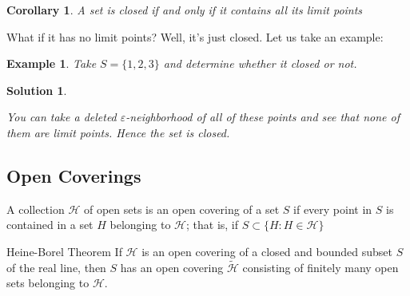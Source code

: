 \documentclass{article}
\newcommand{\sub}{\subset}
\newcommand{\e}{\varepsilon}
\newtheorem{example}{Example}
\newtheorem{solution}{Solution}
\newtheorem{corollary}{Corollary}
\begin{document}
\begin{corollary}
  A set is closed if and only if it contains all its limit points
\end{corollary}
What if it has no limit points? Well, it's just closed. Let us take an example:

\begin{example}{
 Take $S = \{1, 2, 3 \}$ and determine whether it closed or not.
}\end{example}\begin{solution}{


\begin{figure}[H]
  \centering
\end{figure}

You can take a deleted $\e$-neighborhood of all of these points and see that none of them are limit points. Hence the set is closed.
}\end{solution}\vspace{10pt}

\subsection{Open Coverings}

A collection $\mathcal{H}$ of open sets is an open covering of a set $S$ if every point in $S$ is contained in a set $H$ belonging to $\mathcal{H}$; that is, if $\displaystyle{S\sub \{ H : H \in \mathcal{H}\}}$

\begin{theorem}{Heine-Borel Theorem}{}
   If $\mathcal{H}$ is an open covering of a closed and bounded subset $S$ of the real line, then $S$ has an open covering $\widetilde{\mathcal{H}}$ consisting of finitely many open sets belonging to $\mathcal{H}$.
\end{theorem}
\end{document}
